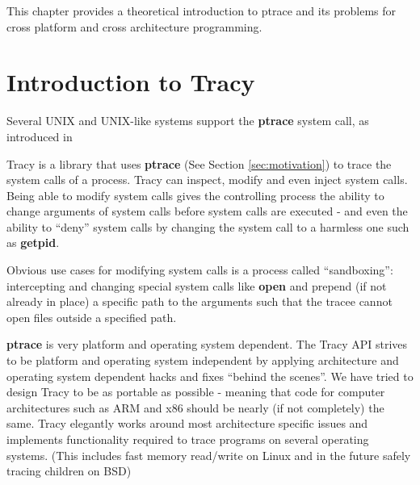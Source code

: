 \documentclass[a4paper, 10pt]{report}
\begin{document}
This chapter provides a theoretical introduction to ptrace and its problems for
cross platform and cross architecture programming.

\section{Introduction to Tracy}

Several UNIX and UNIX-like systems support the \textbf{ptrace} system call, as
introduced in 


Tracy is a library that uses \textbf{ptrace} (See Section \ref{sec:motivation})
to trace the system calls of a process. Tracy can inspect, modify and even
inject system calls. Being able to modify system calls gives the controlling
process the ability to change arguments of system calls before system calls
are executed - and even the ability to ``deny'' system calls by changing the
system call to a harmless one such as \textbf{getpid}.

Obvious use cases for modifying system calls is a process
called ``sandboxing'': intercepting and changing special system calls like
\textbf{open} and prepend (if not already in place) a specific path to the
arguments such that the tracee cannot open files outside a specified path.

\textbf{ptrace} is very platform and operating system dependent.
The Tracy API strives to be platform and operating system independent by
applying architecture and operating system dependent hacks and fixes
``behind the scenes''. We have tried to design Tracy to be as portable as
possible - meaning that code for computer architectures such as ARM and
x86 should be nearly (if not completely) the same.
Tracy elegantly works around most architecture specific issues and implements
functionality required to trace programs on several operating systems.
(This includes fast memory read/write on Linux and in the future safely tracing
children on BSD)
\end{document}
